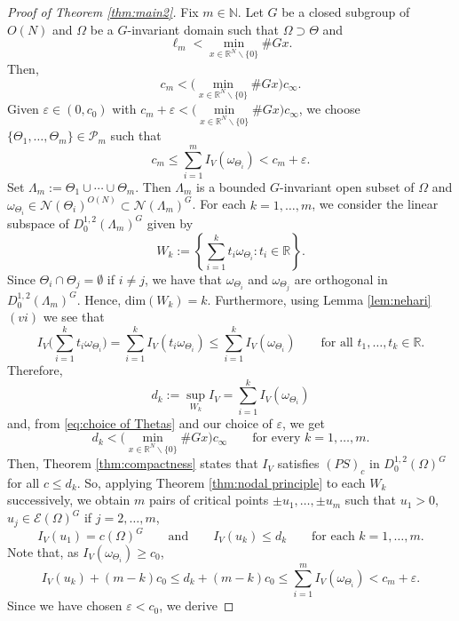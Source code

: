 \documentclass[10pt,letterpaper]{article}
\numberwithin{equation}{section}
\def\r{\mathbb{R}}
\def\rn{\mathbb{R}^N}
\def\eps{\varepsilon}
\def\o{\Omega}
\def\cE{\mathcal{E}}
\def\cN{\mathcal{N}}
\def\dim{\mathrm{dim}}
\begin{document}
\begin{proof}[Proof of Theorem \ref{thm:main2}]
	Fix $m \in \mathbb{N}$. Let $G$ be a closed subgroup of $O(N)$ and $\Omega$ be a $G$-invariant domain such that $\o\supset\Theta$ and
    \begin{equation}\label{condition_1}
  \ell_m < \min_{x\in\rn\smallsetminus\{0\}} \# Gx.
    \end{equation}
Then,
    \[
 c_m < \Big( \min_{x\in\rn\smallsetminus\{0\}} \# Gx \Big) c_{\infty}.
    \] 
	Given $\varepsilon \in (0, c_0)$ with $c_m + \varepsilon < \Big(\min\limits_{x\in\rn\smallsetminus\{0\}}\# Gx\Big) c_{\infty} $, we choose $\{\Theta_1, \ldots, \Theta_m\} \in \mathcal{P}_m$ such that
\begin{equation} \label{eq:choice of Thetas}
c_{m} \leq \sum_{i=1}^{m} I_V(\omega_{\Theta_i}) < c_m + \varepsilon.
\end{equation}
Set $\Lambda_m:=\Theta_1\cup\cdots\cup\Theta_m$. Then $\Lambda_m$ is a bounded $G$-invariant open subset of $\o$
and $\omega_{\Theta_i}\in\cN(\Theta_i)^{O(N)}\subset\cN(\Lambda_m)^G$.
For each $k=1,\ldots, m$, we consider the linear subspace of $D^{1,2}_0(\Lambda_m)^G$ given by
	\[
	W_k:= \left\{\sum_{i=1}^k t_i\omega_{\Theta_i}:t_i\in\r\right\}.
	\]
Since $\Theta_i \cap \Theta_j = \emptyset$ if $i \neq j$, we have that $\omega_{\Theta_i}$ and $\omega_{\Theta_j}$ are orthogonal in $D^{1,2}_0(\Lambda_m)^G$. Hence, $\dim (W_k)= k$. Furthermore, using Lemma \ref{lem:nehari}$(vi)$ we see that
$$I_V\Big(\sum_{i=1}^k t_i\omega_{\Theta_i}\Big)=\sum_{i=1}^k I_V(t_i\omega_{\Theta_i})\leq \sum_{i=1}^k I_V(\omega_{\Theta_i})\qquad\text{for all \ }t_1,\ldots,t_k\in\r.$$
Therefore,
$$d_k:= \sup_{W_k} I_V=\sum_{i=1}^k I_V(\omega_{\Theta_i})$$
and, from \eqref{eq:choice of Thetas} and our choice of $\eps$, we get
$$d_k<\Big(\min\limits_{x\in\rn\smallsetminus\{0\}}\# Gx\Big) c_{\infty}\qquad\text{for every \ }k=1,\ldots,m.$$
Then, Theorem \ref{thm:compactness} states that $I_V$ satisfies $(PS)_c$ in $D^{1,2}_0(\Omega)^G$ for all $c \leq d_k$. So, applying Theorem \ref{thm:nodal principle} to each $W_k$ successively, we obtain $m$ pairs of critical points $\pm u_1, \ldots, \pm u_m$ such that $u_1>0$, $u_j\in\cE(\Omega)^G$ if $j=2,\ldots,m$,
\begin{equation*}
I_V(u_1)=c(\o)^G \qquad\text{and}\qquad  I_V(u_k) \leq d_k \qquad \text{for each } k=1, \ldots,m.  
\end{equation*}
Note that, as $I_V(\omega_{\Theta_i})\geq c_0$,
\[
I_V(u_k)+(m-k)c_0\leq d_k + (m-k)c_0\leq  \sum_{i=1}^{m} I_V (  \omega_{\Theta_i} ) < c_m + \varepsilon.
\]
Since we have chosen $\varepsilon < c_0$, we derive

\end{proof}
\end{document}
